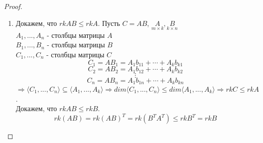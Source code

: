 \documentclass[a4paper, 12pt]{article}
\theoremstyle{definition}
\begin{document}
\begin{proof}
\begin{enumerate}
      \item Докажем, что $rkAB \leq rkA$. Пусть $C =AB$, $\underset{m \times k}{A}, \underset{k \times n}{B}$ \\
      $A_1,...,A_n$ - столбцы матрицы $A$ \\
      $B_1,...,B_n$ - столбцы матрицы $B$ \\
      $C_1,...,C_n$ - столбцы матрицы $C$
      $$C_1 = AB_1 = A_1b_{11} + \cdots + A_kb_{k1}$$ 
      $$C_2 = AB_2 = A_1b_{12} + \cdots + A_kb_{k2}$$
      $$\vdots$$
      $$C_n = AB_n = A_1b_{1n} + \cdots + A_kb_{kn}$$
      $\Longrightarrow \langle C_1,...,C_n \rangle \subseteq \langle A_1,...,A_k \rangle \Longrightarrow dim\langle C_1,...,C_n \rangle \leq dim\langle A_1,...,A_k \rangle \Longrightarrow rkC\leq rkA$. \\
      Докажем, что $rkAB \leq rkB$.
      $$rk(AB) = rk(AB)^T = rk(B^TA^T) \leq rkB^T = rkB$$ 
    \end{enumerate}
  \end{proof} 
\end{document}
